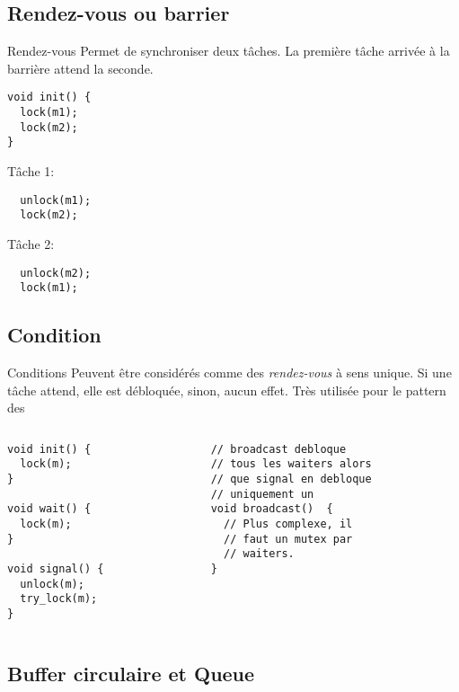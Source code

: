 \subsection{Rendez-vous ou barrier}
\begin{frame}[fragile]{Rendez-vous}
  Permet de synchroniser  deux tâches. La première tâche  arrivée à la
  barrière attend la seconde.
\begin{lstlisting}
void init() {
  lock(m1);
  lock(m2);
}
\end{lstlisting}
Tâche 1:
\begin{lstlisting}
  unlock(m1);
  lock(m2);
\end{lstlisting}
Tâche 2:
\begin{lstlisting}
  unlock(m2);
  lock(m1);
\end{lstlisting}
\end{frame}

\subsection{Condition}

\begin{frame}[fragile]{Conditions}
  Peuvent  être   considérés  comme  des   \emph{rendez-vous}  à  sens
  unique. Si une tâche attend, elle est débloquée, sinon, aucun effet.
  Très utilisée pour le pattern des 
  \begin{columns}
    \begin{column}{5cm}
      \begin{lstlisting}
void init() {
  lock(m);
}

void wait() {
  lock(m);
}

void signal() {
  unlock(m);
  try_lock(m);
}
      \end{lstlisting}
    \end{column}
    \begin{column}{5.5cm}
      \begin{lstlisting}
// broadcast debloque
// tous les waiters alors
// que signal en debloque
// uniquement un
void broadcast()  {
  // Plus complexe, il
  // faut un mutex par
  // waiters.
}
      \end{lstlisting}
    \end{column}
  \end{columns}
\end{frame}

\subsection{Buffer circulaire et Queue}


